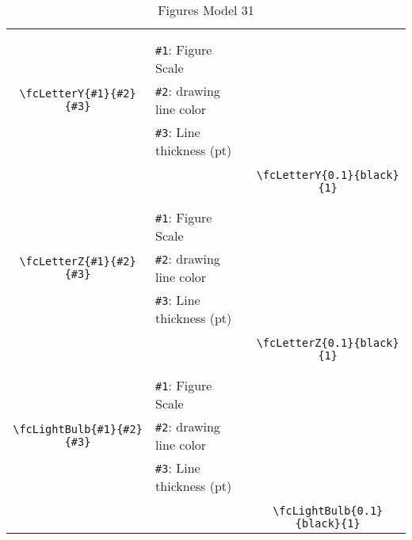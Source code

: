 \documentclass[x11names]{article}
\begin{document}
\begin{table}[H]
\begin{tabular}{|c|l|c|}
	&&\multirow{5}{*}{\fcLetterY{0.1}{black}{1}}\\	&&\\	&\verb|#1|: Figure Scale &\\	\verb|\fcLetterY{#1}{#2}{#3}|&	\verb|#2|: drawing line color &\\	&\verb|#3|: Line thickness (pt) &\\ &&\\&&	\verb|\fcLetterY{0.1}{black}{1}|\\\hline 	
	&&\multirow{5}{*}{\fcLetterZ{0.1}{black}{1}}\\	&&\\	&\verb|#1|: Figure Scale &\\	\verb|\fcLetterZ{#1}{#2}{#3}|&	\verb|#2|: drawing line color &\\	&\verb|#3|: Line thickness (pt) &\\ &&\\&&	\verb|\fcLetterZ{0.1}{black}{1}|\\\hline 	
	&&\multirow{5}{*}{\fcLightBulb{0.1}{black}{1}}\\	&&\\	&\verb|#1|: Figure Scale &\\	\verb|\fcLightBulb{#1}{#2}{#3}|&	\verb|#2|: drawing line color &\\	&\verb|#3|: Line thickness (pt) &\\ &&\\&&	\verb|\fcLightBulb{0.1}{black}{1}|\\\hline 	\hline\end{tabular}\caption{Figures Model 31}\label{tab31}\end{table}
\end{document}
